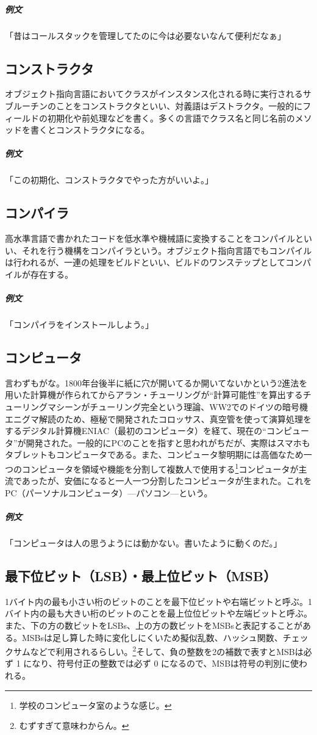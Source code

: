 \documentclass[dvipdfmx,jb5]{jreport}
\begin{document}
\subparagraph{例文} 「昔はコールスタックを管理してたのに今は必要ないなんて便利だなぁ」

\subsection{コンストラクタ}
オブジェクト指向言語においてクラスがインスタンス化される時に実行されるサブルーチンのことをコンストラクタといい、対義語はデストラクタ。一般的にフィールドの初期化や前処理などを書く。多くの言語でクラス名と同じ名前のメソッドを書くとコンストラクタになる。

\subparagraph{例文} 「この初期化、コンストラクタでやった方がいいよ。」

\subsection{コンパイラ}
高水準言語で書かれたコードを低水準や機械語に変換することをコンパイルといい、それを行う機構をコンパイラという。オブジェクト指向言語でもコンパイルは行われるが、一連の処理をビルドといい、ビルドのワンステップとしてコンパイルが存在する。

\subparagraph{例文} 「コンパイラをインストールしよう。」

\subsection{コンピュータ}
言わずもがな。1800年台後半に紙に穴が開いてるか開いてないかという2進法を用いた計算機が作られてからアラン・チューリングが``計算可能性''を算出するチューリングマシーンがチューリング完全という理論、WW2でのドイツの暗号機エニグマ解読のため、極秘で開発されたコロッサス、真空管を使って演算処理をするデジタル計算機ENIAC（最初のコンピュータ）を経て、現在の``コンピュータ''が開発された。一般的にPCのことを指すと思われがちだが、実際はスマホもタブレットもコンピュータである。また、コンピュータ黎明期には高価なため一つのコンピュータを領域や機能を分割して複数人で使用する\footnote{学校のコンピュータ室のような感じ。}コンピュータが主流であったが、安価になると一人一つ分割したコンピュータが生まれた。これをPC（パーソナルコンピュータ）---パソコン---という。

\subparagraph{例文} 「コンピュータは人の思うようには動かない。書いたように動くのだ。」

\subsection{最下位ビット（LSB）・最上位ビット（MSB）}
1バイト内の最も小さい桁のビットのことを最下位ビットや右端ビットと呼ぶ。1バイト内の最も大きい桁のビットのことを最上位位ビットや左端ビットと呼ぶ。また、下の方の数ビットをLSBs、上の方の数ビットをMSBsと表記することがある。MSBsは足し算した時に変化しにくいため擬似乱数、ハッシュ関数、チェックサムなどで利用されるらしい。\footnote{むずすぎて意味わからん。}そして、負の整数を2の補数で表すとMSBは必ず 1 になり、符号付正の整数では必ず 0 になるので、MSBは符号の判別に使われる。
\end{document}

